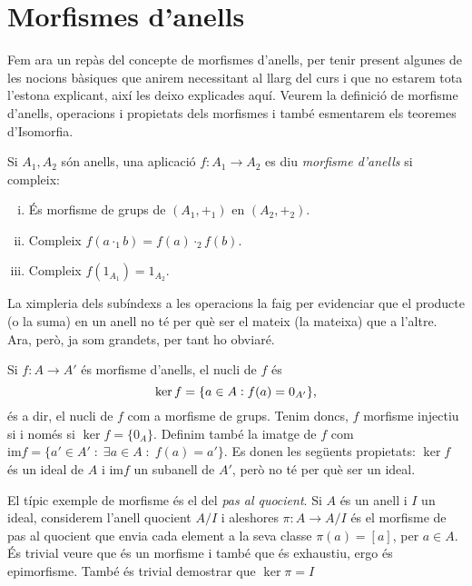 \documentclass[../main.tex]{subfiles}
\begin{document}
\section{Morfismes d'anells}

Fem ara un repàs del concepte de morfismes d'anells, per tenir present algunes de les nocions bàsiques que anirem necessitant al llarg del curs i que no estarem tota l'estona explicant, així les deixo explicades aquí. Veurem la definició de morfisme d'anells, operacions i propietats dels morfismes i també esmentarem els teoremes d'Isomorfia. 

\begin{defi}
\label{def:morfismedanells} Si $A_1,A_2$ són anells, una aplicació $f:A_1\rightarrow A_2$ es diu \textit{morfisme d'anells} si compleix:
\begin{enumerate}[(i)]
    \item És morfisme de grups de $(A_1,+_1)$ en $(A_2,+_2)$.
    \item Compleix $f(a\cdotp_1 b) = f(a)\cdotp_2 f(b)$.
    \item Compleix $f(1_{A_1}) = 1_{A_2}$.
\end{enumerate}
\end{defi}


La ximpleria dels subíndexs a les operacions la faig per evidenciar que el producte (o la suma) en un anell no té per què ser el mateix (la mateixa) que a l'altre. Ara, però, ja som grandets, per tant ho obviaré.


Si $f:A\rightarrow A'$ és morfisme d'anells, el nucli de $f$ és
\begin{equation}
    \notag
    \ker f = \{a\in A:f(a) = 0_{A'}\},
\end{equation}
és a dir, el nucli de $f$ com a morfisme de grups. Tenim doncs, $f$ morfisme injectiu si i només si $\ker f = \{0_A\}$. Definim també la imatge de $f$ com $\mathrm{im} f = \{a'\in A'\;:\;\exists a\in A\;:\;f(a) = a'\}$. Es donen les següents propietats: $\ker f$ és un ideal de $A$ i $\mathrm{im}f$ un subanell de $A'$, però no té per què ser un ideal.

\begin{ej}
\label{def:pasquocient} El típic exemple de morfisme és el del \textit{pas al quocient}. Si $A$ és un anell i $I$ un ideal, considerem l'anell quocient $A/I$ i aleshores $\pi:A\rightarrow A/I$ és el morfisme de pas al quocient que envia cada element a la seva classe $\pi(a) = [a]$, per $a\in A$. És trivial veure que és un morfisme i també que és exhaustiu, ergo és epimorfisme. També és trivial demostrar que $\ker\pi = I$
\end{ej}
\end{document}
